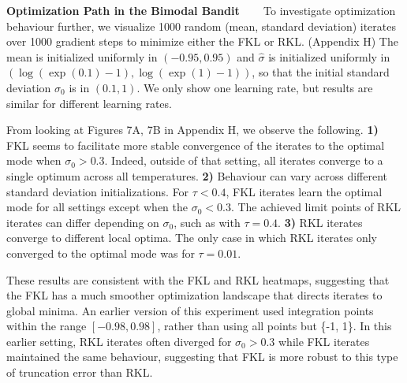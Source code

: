 \documentclass[twoside,11pt]{article}
\newcommand{\myparagraph}[1]{\textbf{#1} \ \ \ }
\begin{document}
\myparagraph{Optimization Path in the Bimodal Bandit}
To investigate optimization behaviour further, we visualize 1000 random (mean, standard deviation) iterates over 1000 gradient steps to minimize either the FKL or RKL. (Appendix H) The mean is initialized uniformly in $(-0.95, 0.95)$ and $\hat{\sigma}$ is initialized uniformly in $(\log(\exp(0.1) - 1), \log(\exp(1) - 1))$, so that the initial standard deviation $\sigma_0$ is in $(0.1, 1)$. We only show one learning rate, but results are similar for different learning rates.

From looking at Figures 7A, 7B in Appendix H, we observe the following. 
\textbf{1)} FKL seems to facilitate more stable convergence of the iterates to the optimal mode when $\sigma_0 > 0.3$. Indeed, outside of that setting, all iterates converge to a single optimum across all temperatures.
\textbf{2)} Behaviour can vary across different standard deviation initializations. For $\tau < 0.4$, FKL iterates learn the optimal mode for all settings except when the $\sigma_0 < 0.3$. The achieved limit points of RKL iterates can differ depending on $\sigma_0$, such as with $\tau = 0.4$. 
\textbf{3)} RKL iterates converge to different local optima. The only case in which RKL iterates only converged to the optimal mode was for $\tau = 0.01$. 
% 

These results are consistent with the FKL and RKL heatmaps, suggesting that the FKL has a much smoother optimization landscape that directs iterates to global minima. An earlier version of this experiment used integration points within the range $[-0.98, 0.98]$, rather than using all points but \{-1, 1\}. In this earlier setting, RKL iterates often diverged for $\sigma_0 > 0.3$ while FKL iterates maintained the same behaviour, suggesting that FKL is more robust to this type of truncation error than RKL. %

\end{document}
